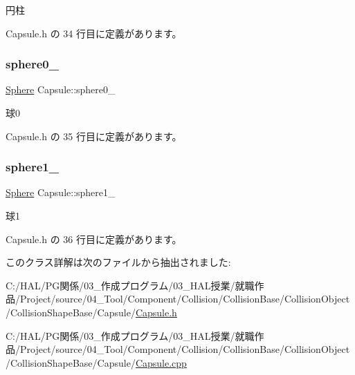 円柱 



 Capsule.\+h の 34 行目に定義があります。

\mbox{\label{class_capsule_a37c7db7fe8cb06be2f374d7aba24267e}} 
\subsubsection{\texorpdfstring{sphere0\+\_\+}{sphere0\_}}
{\footnotesize\ttfamily \mbox{\hyperlink{class_sphere}{Sphere}} Capsule\+::sphere0\+\_\+\hspace{0.3cm}{\ttfamily [private]}}



球0 



 Capsule.\+h の 35 行目に定義があります。

\mbox{\label{class_capsule_ac478efc95993a85908a7cd2759133ab2}} 
\subsubsection{\texorpdfstring{sphere1\+\_\+}{sphere1\_}}
{\footnotesize\ttfamily \mbox{\hyperlink{class_sphere}{Sphere}} Capsule\+::sphere1\+\_\+\hspace{0.3cm}{\ttfamily [private]}}



球1 



 Capsule.\+h の 36 行目に定義があります。



このクラス詳解は次のファイルから抽出されました\+:\begin{DoxyCompactItemize}
\item 
C\+:/\+H\+A\+L/\+P\+G関係/03\+\_\+作成プログラム/03\+\_\+\+H\+A\+L授業/就職作品/\+Project/source/04\+\_\+\+Tool/\+Component/\+Collision/\+Collision\+Base/\+Collision\+Object/\+Collision\+Shape\+Base/\+Capsule/\mbox{\hyperlink{_capsule_8h}{Capsule.\+h}}\item 
C\+:/\+H\+A\+L/\+P\+G関係/03\+\_\+作成プログラム/03\+\_\+\+H\+A\+L授業/就職作品/\+Project/source/04\+\_\+\+Tool/\+Component/\+Collision/\+Collision\+Base/\+Collision\+Object/\+Collision\+Shape\+Base/\+Capsule/\mbox{\hyperlink{_capsule_8cpp}{Capsule.\+cpp}}\end{DoxyCompactItemize}
